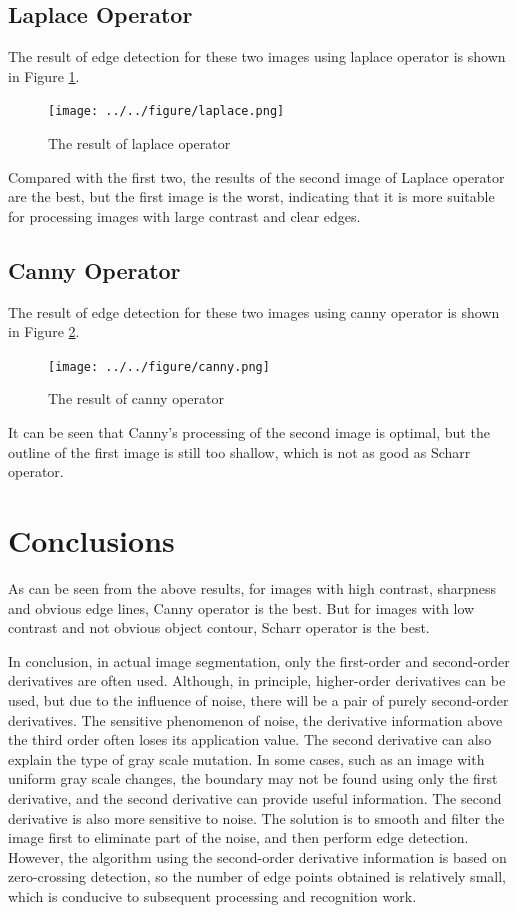 \documentclass[review]{cvpr}
\begin{document}
\subsection{Laplace Operator}

The result of edge detection for these two images using laplace operator is shown in Figure \ref{laplace}.

\begin{figure}[htbp]
\centering
  \texttt{[image: ../../figure/laplace.png]}
  \caption{The result of laplace operator}
  \label{laplace}
\end{figure}

Compared with the first two, the results of the second image of Laplace operator are the best, but the first image is the worst, indicating that it is more suitable for processing images with large contrast and clear edges.

\subsection{Canny Operator}

The result of edge detection for these two images using canny operator is shown in Figure \ref{canny}.

\begin{figure}[htbp]
\centering
  \texttt{[image: ../../figure/canny.png]}
  \caption{The result of canny operator}
  \label{canny}
\end{figure}

It can be seen that Canny's processing of the second image is optimal, but the outline of the first image is still too shallow, which is not as good as Scharr operator.

\section{Conclusions}
As can be seen from the above results, for images with high contrast, sharpness and obvious edge lines, Canny operator is the best. But for images with low contrast and not obvious object contour, Scharr operator is the best.

In conclusion, in actual image segmentation, only the first-order and second-order derivatives are often used. Although, in principle, higher-order derivatives can be used, but due to the influence of noise, there will be a pair of purely second-order derivatives. The sensitive phenomenon of noise, the derivative information above the third order often loses its application value. The second derivative can also explain the type of gray scale mutation. In some cases, such as an image with uniform gray scale changes, the boundary may not be found using only the first derivative, and the second derivative can provide useful information. The second derivative is also more sensitive to noise. The solution is to smooth and filter the image first to eliminate part of the noise, and then perform edge detection. However, the algorithm using the second-order derivative information is based on zero-crossing detection, so the number of edge points obtained is relatively small, which is conducive to subsequent processing and recognition work.
\end{document}
